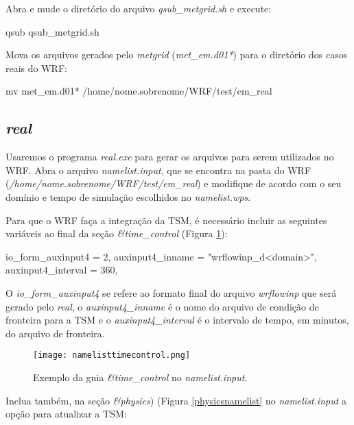 \noindent Abra e mude o diretório do arquivo \textit{qsub\_metgrid.sh} e execute:
\bigskip

\begin{bashcode}
qsub qsub_metgrid.sh
\end{bashcode}
\bigskip

\noindent Mova os arquivos gerados pelo \textit{metgrid} (\textit{met\_em.d01*}) para o diretório dos casos reais do WRF:
\bigskip

\begin{bashcode}
 mv met_em.d01* /home/nome.sobrenome/WRF/test/em_real
\end{bashcode}
\bigskip

\subsection{\textit{real}}\label{realsecao}
\bigskip

\noindent Usaremos o programa \textit{real.exe} para gerar os arquivos para serem utilizados no WRF. Abra o arquivo \textit{namelist.input}, que se encontra na pasta do WRF (\textit{/home/nome.sobrenome/WRF/test/em\_real}) e modifique de acordo com o seu domínio e tempo de simulação escolhidos no \textit{namelist.wps}.
\bigskip

\noindent Para que o WRF faça a integração da TSM, é necessário incluir as seguintes variáveis ao final da seção \textit{\&time\_control} (Figura \textcolor{bleu_cite}{\ref{timecontrolnamelist}}):
\bigskip

\begin{bashcode}
io_form_auxinput4  = 2,
auxinput4_inname   = "wrflowinp_d<domain>",
auxinput4_interval = 360,
\end{bashcode}
\bigskip

\noindent O \textit{io\_form\_auxinput4} se refere ao formato final do arquivo \textit{wrflowinp} que será gerado pelo \textit{real}, o \textit{auxinput4\_inname} é o nome do arquivo de condição de fronteira para a TSM e o \textit{auxinput4\_interval} é o intervalo de tempo, em minutos, do arquivo de fronteira.
\bigskip

\begin{figure}[H]
    \centering
    \texttt{[image: namelisttimecontrol.png]}
    \caption{Exemplo da guia \textit{\&time\_control} no \textit{namelist.input}.}
    \label{timecontrolnamelist}
\end{figure}
\bigskip

\noindent Inclua também, na seção \textit{\&physics}) (Figura \textcolor{bleu_cite}{\ref{physicsnamelist}} no \textit{namelist.input} a opção para atualizar a TSM:
\bigskip

